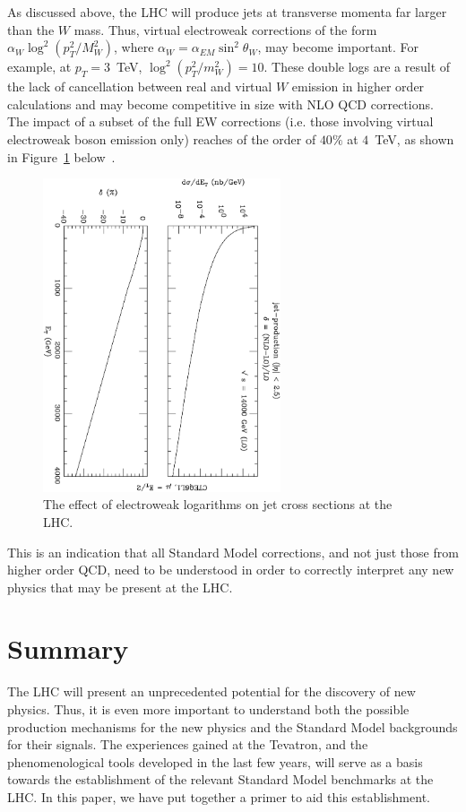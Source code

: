 \documentclass[12pt]{iopart}
\begin{document}
As discussed above, the LHC will produce jets at transverse momenta far larger than the 
$W$ mass. Thus, virtual electroweak corrections of the form $\alpha_W \log^2(p_T^2/M_W^2)$, 
where $\alpha_W=\alpha_{EM}\sin^2\theta_W$, may become important. For example, at $p_T=3$~TeV,
$\log^2(p_T^2/m_W^2)=10$. These double logs are a result of the lack of cancellation 
between real and virtual $W$ emission in higher order calculations and may become competitive 
in size with NLO QCD corrections. The impact of a subset of the full EW corrections (i.e. those
involving virtual electroweak boson emission only) reaches of the order of 
$40\%$ at $4$~TeV, as shown in Figure~\ref{fig:lhc_logs} below~\cite{Moretti:2005ut}.
%
\begin{figure}[t]
\begin{center}
\includegraphics[width=7cm,angle=90]{fig_LHC_newscale.ps}
\end{center}
\caption{
The effect of electroweak logarithms on jet cross sections at the LHC.} 
\label{fig:lhc_logs}
\end{figure}
%
This is an indication that  all Standard Model corrections, and not just those from higher order QCD, need to
be understood in order to correctly interpret any new physics that  may be present at the LHC. 


\section{Summary}
\label{sec:summary}

The LHC will present an unprecedented potential for the discovery of new physics. Thus, it is even more important to understand both
the possible production mechanisms for the new physics and the Standard Model backgrounds for their signals. The experiences gained
at the Tevatron, and the phenomenological tools developed in the last few years, will serve as a basis towards the establishment of
the relevant Standard Model benchmarks at the LHC. In this paper, we have put together a primer to aid this establishment. 
\end{document}
